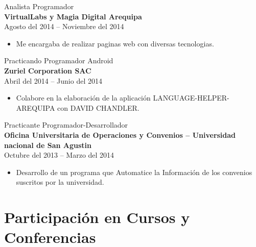 \documentclass[letterpaper]{twentysecondcv} %
\begin{document}
{\Large Analista Programador}\\
{\large \bf VirtualLabs y Magia Digital Arequipa}\\
{Agosto del 2014 -- Noviembre del 2014}
\begin{itemize}
\item Me encargaba de realizar paginas web con diversas tecnologias. \\
\end{itemize}


{\Large Practicando Programador Android}\\
{\large \bf Zuriel Corporation SAC}\\
{Abril del 2014 -- Junio del 2014}
\begin{itemize}
\item Colabore en la elaboración de la aplicación LANGUAGE-HELPER-AREQUIPA con DAVID CHANDLER.\\
\end{itemize}


{\Large Practicante Programador-Desarrollador}\\
{\large \bf Oficina Universitaria de Operaciones y Convenios – Universidad nacional de San Agustin}\\
{Octubre del 2013 -- Marzo del 2014}
\begin{itemize}
\item Desarrollo de un programa que Automatice la Información de los convenios suscritos por la universidad.\\  
\end{itemize}


\section{Participación en Cursos y Conferencias}
\end{document}
